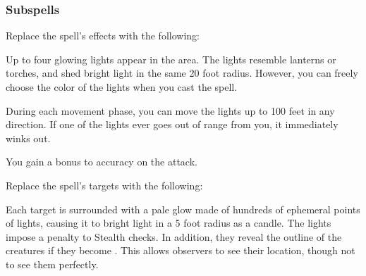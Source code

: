 \subsubsection{Subspells}





Replace the spell's effects with the following:
\begin{spellcontent}

\begin{augmenteffects}



\spelleffect
Up to four glowing lights appear in the area.
The lights resemble lanterns or torches, and shed bright light in the same 20 foot radius.
However, you can freely choose the color of the lights when you cast the spell.

During each movement phase, you can move the lights up to 100 feet in any direction.
If one of the lights ever goes out of range from you, it immediately winks out.








\end{augmenteffects}

\end{spellcontent}





You gain a  bonus to accuracy on the attack.


Replace the spell's targets with the following:
\begin{spellcontent}

\begin{augmenttargetinginfo}




\end{augmenttargetinginfo}

\end{spellcontent}






Each target is surrounded with a pale glow made of hundreds of ephemeral points of lights, causing it to bright light in a 5 foot radius as a candle.
The lights impose a  penalty to Stealth checks.
In addition, they reveal the outline of the creatures if they become .
This allows observers to see their location, though not to see them perfectly.







